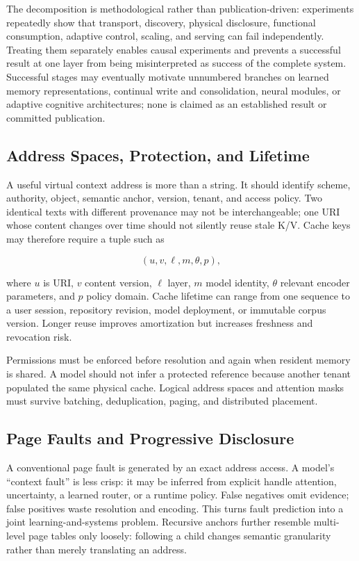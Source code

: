 \documentclass[11pt]{article}
\begin{document}
The decomposition is methodological rather than publication-driven: experiments repeatedly show
that transport, discovery, physical disclosure, functional consumption, adaptive control, scaling,
and serving can fail independently.  Treating them separately enables causal experiments and
prevents a successful result at one layer from being misinterpreted as success of the complete
system.  Successful stages may eventually motivate unnumbered branches on learned memory
representations, continual write and consolidation, neural modules, or adaptive cognitive
architectures; none is claimed as an established result or committed publication.
\fi

\subsection{Address Spaces, Protection, and Lifetime}

A useful virtual context address is more than a string. It should identify scheme, authority, object, semantic anchor, version, tenant, and access policy. Two identical texts with different provenance may not be interchangeable; one URI whose content changes over time should not silently reuse stale K/V. Cache keys may therefore require a tuple such as

\begin{equation}
(u, v, \ell, m, \theta, p),
\end{equation}

where $u$ is URI, $v$ content version, $\ell$ layer, $m$ model identity, $\theta$ relevant encoder parameters, and $p$ policy domain. Cache lifetime can range from one sequence to a user session, repository revision, model deployment, or immutable corpus version. Longer reuse improves amortization but increases freshness and revocation risk.

Permissions must be enforced before resolution and again when resident memory is shared. A model should not infer a protected reference because another tenant populated the same physical cache. Logical address spaces and attention masks must survive batching, deduplication, paging, and distributed placement.

\subsection{Page Faults and Progressive Disclosure}

A conventional page fault is generated by an exact address access. A model's ``context fault'' is less crisp: it may be inferred from explicit handle attention, uncertainty, a learned router, or a runtime policy. False negatives omit evidence; false positives waste resolution and encoding. This turns fault prediction into a joint learning-and-systems problem. Recursive anchors further resemble multi-level page tables only loosely: following a child changes semantic granularity rather than merely translating an address.
\end{document}
